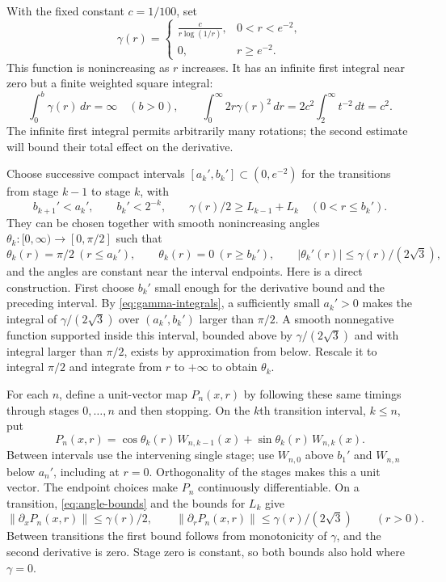 With the fixed constant $c=1/100$, set
\begin{equation}
\label{eq:gamma}
 \gamma(r)=
 \begin{cases}
 \displaystyle\frac{c}{r\log(1/r)},&0<r<e^{-2},\\[4pt]
 0,&r\ge e^{-2}.
 \end{cases}
\end{equation}
This function is nonincreasing as $r$ increases. It has an infinite
first integral near zero but a finite weighted square integral:
\begin{equation}
\label{eq:gamma-integrals}
 \int_0^b\gamma(r)\,dr=\infty\quad(b>0),
 \qquad
 \int_0^\infty2r\gamma(r)^2\,dr
 =2c^2\int_2^\infty t^{-2}\,dt=c^2.
\end{equation}
The infinite first integral permits arbitrarily many rotations; the
second estimate will bound their total effect on the derivative.

Choose successive compact intervals $[a_k',b_k']\subset(0,e^{-2})$
for the transitions from stage $k-1$ to stage $k$, with
\[
 b_{k+1}'<a_k',\qquad b_k'<2^{-k},\qquad
 \gamma(r)/2\ge L_{k-1}+L_k\quad(0<r\le b_k').
\]
They can be chosen together with smooth nonincreasing angles
$\theta_k:[0,\infty)\to[0,\pi/2]$ such that
\begin{equation}
\label{eq:angle-bounds}
 \theta_k(r)=\pi/2\ (r\le a_k'),\qquad
 \theta_k(r)=0\ (r\ge b_k'),\qquad
 |\theta_k'(r)|\le\gamma(r)/(2\sqrt3),
\end{equation}
and the angles are constant near the interval endpoints. Here is a
direct construction. First choose $b_k'$ small enough for the
derivative bound and the preceding interval. By
\eqref{eq:gamma-integrals}, a sufficiently small $a_k'>0$ makes the
integral of $\gamma/(2\sqrt3)$ over $(a_k',b_k')$ larger than
$\pi/2$. A smooth nonnegative function supported inside this
interval, bounded above by $\gamma/(2\sqrt3)$ and with integral
larger than $\pi/2$, exists by approximation from below. Rescale it
to integral $\pi/2$ and integrate from $r$ to $+\infty$ to obtain
$\theta_k$.

For each $n$, define a unit-vector map $P_n(x,r)$ by following these
same timings through stages $0,\ldots,n$ and then stopping. On the
$k$th transition interval, $k\le n$, put
\[
 P_n(x,r)=\cos\theta_k(r)\,W_{n,k-1}(x)
            +\sin\theta_k(r)\,W_{n,k}(x).
\]
Between intervals use the intervening single stage; use $W_{n,0}$
above $b_1'$ and $W_{n,n}$ below $a_n'$, including at $r=0$.
Orthogonality of the stages makes this a unit vector. The endpoint
choices make $P_n$ continuously differentiable. On a transition,
\eqref{eq:angle-bounds} and the bounds for $L_k$ give
\begin{equation}
\label{eq:P-derivatives}
 \|\partial_xP_n(x,r)\|\le\gamma(r)/2,
 \qquad
 \|\partial_rP_n(x,r)\|\le\gamma(r)/(2\sqrt3)
 \qquad(r>0).
\end{equation}
Between transitions the first bound follows from monotonicity of
$\gamma$, and the second derivative is zero. Stage zero is constant,
so both bounds also hold where $\gamma=0$.

